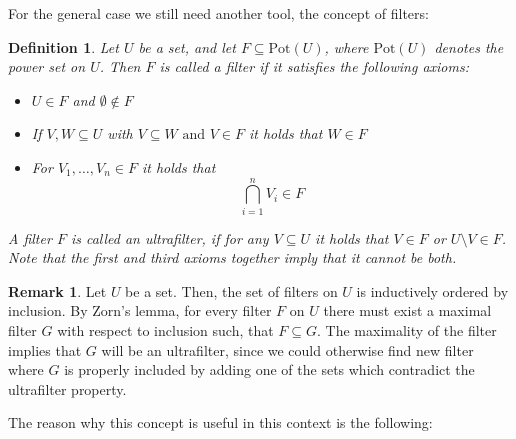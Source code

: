 \documentclass{article}
\theoremstyle{plain}
\newtheorem{defn}[Satz]{Definition}
\theoremstyle{definition}
\newtheorem{rem}[Satz]{Remark}
\begin{document}
For the general case we still need another tool, the concept of filters:

\begin{defn}
Let $U$ be a set, and let $F \subseteq \text{Pot}(U)$, where $\text{Pot}(U)$ denotes the power set on $U$. Then $F$ is called a \emph{filter} if it satisfies the following axioms: 
\begin{itemize}
\item  $U \in F$ and $\emptyset \notin F$
\item If $V,W \subseteq U$ with $V \subseteq W \text{ and }V  \in F $ it holds that $W \in F$
\item For $V_1, \ldots, V_n \in F$ it holds that \[ \bigcap_{i = 1}^n V_i \in F \]
\end{itemize}
A filter $F$ is called an \emph{ultrafilter}, if for any $V \subseteq U$ it holds that $V \in F$ or $U \setminus V \in F$. Note that the first and third axioms together imply that it cannot be both.
\end{defn}

\begin{rem}
Let $U$ be a set. Then, the set of filters on $U$ is inductively ordered by inclusion. By Zorn's lemma, for every filter $F$ on $U$ there must exist a maximal filter $G$ with respect to inclusion such, that $F \subseteq G$.
The maximality of the filter implies that $G$ will be an ultrafilter, since we could otherwise find new filter where $G$ is properly included by adding one of the sets which contradict the ultrafilter property.
\end{rem}

The reason why this concept is useful in this context is the following:
\end{document}
